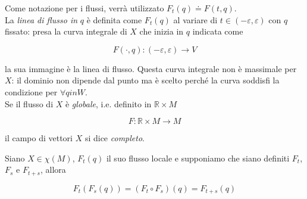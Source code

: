 Come notazione per i flussi, verrà utilizzato $ F_{t}(q) \doteq F(t,q) $.\\
La \textit{linea di flusso in} $ q $ è definita come $ F_{t}(q) $ al variare di $ t \in (-\varepsilon,\varepsilon) $ con $ q $ fissato: presa la curva integrale di $ X $ che inizia in $ q $ indicata come

\begin{equation}
	F(\cdot,q) : (-\varepsilon,\varepsilon) \to V
\end{equation}

la sua immagine è la linea di flusso. Questa curva integrale non è massimale per $ X $: il dominio non dipende dal punto ma è scelto perché la curva soddisfi la condizione per $ \forall q in W $.\\
Se il flusso di $ X $ è \textit{globale}, i.e. definito in $ \mathbb{R} \times M $

\begin{equation}
	F : \mathbb{R} \times M \to M
\end{equation}

il campo di vettori $ X $ si dice \textit{completo}.

\begin{definition}
	Siano $ X \in \chi(M) $, $ F_{t}(q) $ il suo flusso locale e supponiamo che siano definiti $ F_{t} $, $ F_{s} $ e $ F_{t+s} $, allora
	
	\begin{equation}
		F_{t}(F_{s}(q)) = (F_{t} \circ F_{s})(q) = F_{t+s}(q)
	\end{equation}
\end{definition}

